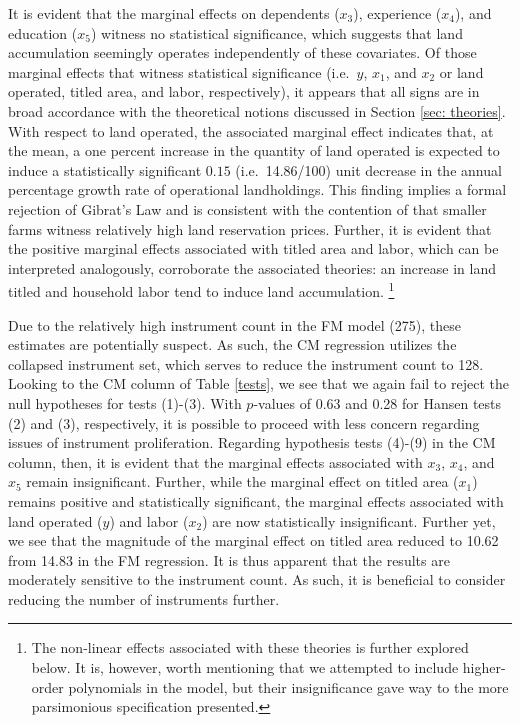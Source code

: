 \documentclass[english]{article}
\begin{document}
It is evident that the marginal effects on dependents ($x_3$), experience 
($x_4$), and education ($x_5$) witness no statistical significance, which 
suggests that land accumulation seemingly operates independently of these 
covariates.
Of those marginal effects that witness statistical significance (i.e.\ $y$, $x_1$, 
and $x_2$ or land operated, titled area, and labor, respectively), it appears that 
all signs are in broad accordance with the theoretical notions discussed in 
Section \ref{sec: theories}.
With respect to land operated, the associated marginal effect indicates that, at
the mean, a one percent increase in the quantity of land operated is expected to 
induce a statistically significant $0.15$ (i.e.\ 14.86/100) unit decrease in the 
annual percentage growth rate of operational landholdings. 
This finding implies a formal rejection of Gibrat's Law and is consistent with 
the contention of \citet{carter1993} that smaller farms witness relatively 
high land reservation prices.
Further, it is evident that the positive marginal effects associated with titled 
area and labor, which can be interpreted analogously, corroborate the 
associated theories: an increase in land titled and household labor tend to 
induce land accumulation.%
\footnote{The non-linear effects associated with these theories is further 
explored below. 
It is, however, worth mentioning that we attempted to include higher-order
polynomials in the model, but their insignificance gave way to the more 
parsimonious specification presented.}

Due to the relatively high instrument count in the FM model (275), these
estimates are potentially suspect.
As such, the CM regression utilizes the collapsed instrument set, which
serves to reduce the instrument count to 128.
Looking to the CM column of Table \ref{tests}, we see that we again fail
to reject the null hypotheses for tests (1)-(3).
With $p$-values of 0.63 and 0.28 for Hansen tests (2) and (3), respectively, 
it is possible to proceed with less concern regarding issues of instrument 
proliferation.
Regarding hypothesis tests (4)-(9) in the CM column, then, it is evident that
the marginal effects associated with $x_3$, $x_4$, and $x_5$ remain 
insignificant.
Further, while the marginal effect on titled area ($x_1$) remains positive
and statistically significant, the marginal effects associated with land operated
($y$) and labor ($x_2$) are now statistically insignificant.
Further yet, we see that the magnitude of the marginal effect on titled area
reduced to 10.62 from 14.83 in the FM regression.
It is thus apparent that the results are moderately sensitive to the instrument
count.
As such, it is beneficial to consider reducing the number of instruments further.
\end{document}
